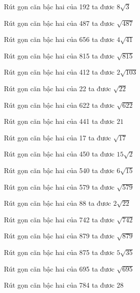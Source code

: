 \documentclass[12pt,a4paper]{article}
\begin{document}
\begin{ex}
Rút gọn căn bậc hai của 192 ta đươc $8\sqrt{3}$
\end{ex}
\begin{ex}
Rút gọn căn bậc hai của 487 ta đươc $\sqrt{487}$
\end{ex}
\begin{ex}
Rút gọn căn bậc hai của 656 ta đươc $4\sqrt{41}$
\end{ex}
\begin{ex}
Rút gọn căn bậc hai của 815 ta đươc $\sqrt{815}$
\end{ex}
\begin{ex}
Rút gọn căn bậc hai của 412 ta đươc $2\sqrt{103}$
\end{ex}
\begin{ex}
Rút gọn căn bậc hai của 22 ta đươc $\sqrt{22}$
\end{ex}
\begin{ex}
Rút gọn căn bậc hai của 622 ta đươc $\sqrt{622}$
\end{ex}
\begin{ex}
Rút gọn căn bậc hai của 441 ta đươc $21$
\end{ex}
\begin{ex}
Rút gọn căn bậc hai của 17 ta đươc $\sqrt{17}$
\end{ex}
\begin{ex}
Rút gọn căn bậc hai của 450 ta đươc $15\sqrt{2}$
\end{ex}
\begin{ex}
Rút gọn căn bậc hai của 540 ta đươc $6\sqrt{15}$
\end{ex}
\begin{ex}
Rút gọn căn bậc hai của 579 ta đươc $\sqrt{579}$
\end{ex}
\begin{ex}
Rút gọn căn bậc hai của 88 ta đươc $2\sqrt{22}$
\end{ex}
\begin{ex}
Rút gọn căn bậc hai của 742 ta đươc $\sqrt{742}$
\end{ex}
\begin{ex}
Rút gọn căn bậc hai của 879 ta đươc $\sqrt{879}$
\end{ex}
\begin{ex}
Rút gọn căn bậc hai của 875 ta đươc $5\sqrt{35}$
\end{ex}
\begin{ex}
Rút gọn căn bậc hai của 695 ta đươc $\sqrt{695}$
\end{ex}
\begin{ex}
Rút gọn căn bậc hai của 784 ta đươc $28$
\end{ex}
\end{document}
